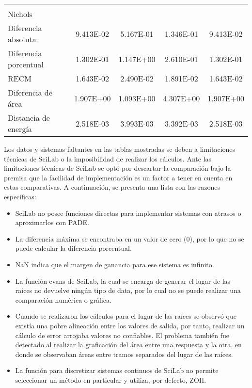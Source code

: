 {\begin{longtable}{l @{\extracolsep{\fill}} cccc}
            & & & & \\
            Nichols                & & & & \\ \cmidrule{1-1}
            Diferencia absoluta    & \num{9.413E-02} & \num{5.167E-01} & \num{1.346E-01} & \num{9.413E-02}  \\
            Diferencia porcentual  & \num{1.302E-01} & \num{1.147E+00} & \num{2.610E-01} & \num{1.302E-01}  \\
            RECM                   & \num{1.643E-02} & \num{2.490E-02} & \num{1.891E-02} & \num{1.643E-02}  \\
            Diferencia de área     & \num{1.907E+00} & \num{1.093E+00} & \num{4.307E+00} & \num{1.907E+00}  \\
            Distancia de energía   & \num{2.518E-03} & \num{3.993E-03} & \num{3.392E-03} & \num{2.518E-03}  \\
        \end{longtable}}

        Los datos y sistemas faltantes en las tablas mostradas se deben a limitaciones técnicas de SciLab o la imposibilidad de realizar los cálculos. Ante las limitaciones técnicas de SciLab se optó por descartar la comparación bajo la premisa que la facilidad de implementación es un factor a tener en cuenta en estas comparativas. A continuación, se presenta una lista con las razones específicas:

        \begin{itemize}[leftmargin=\parindent]
            \item SciLab no posee funciones directas para implementar sistemas con atrasos o aproximarlos con PADE.
            \item La diferencia máxima se encontraba en un valor de cero (0), por lo que no se puede calcular la diferencia porcentual.
            \item NaN indica que el margen de ganancia para ese sistema es infinito.
            \item La función evans de SciLab, la cual se encarga de generar el lugar de las raíces no devuelve ningún tipo de data, por lo cual no se puede realizar una comparación numérica o gráfica.
            \item Cuando se realizaron los cálculos para el lugar de las raíces se observó que existía una pobre alineación entre los valores de salida, por tanto, realizar un cálculo de error arrojaba valores no confiables. El problema también fue detectado al realizar la graficación del área entre una respuesta y la otra, en donde se observaban áreas entre tramos separados del lugar de las raíces.
            \item La función para discretizar sistemas continuos de SciLab no permite seleccionar un método en particular y utiliza, por defecto, ZOH.
        \end{itemize}

